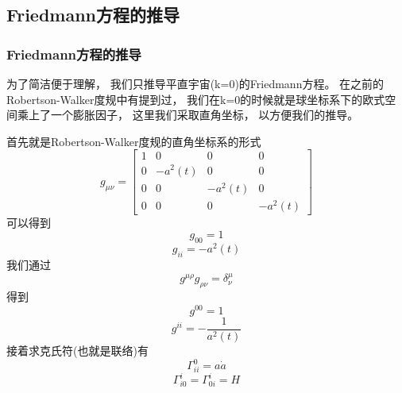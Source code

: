 \documentclass[8pt]{beamer}
\begin{document}
    \subsection{Friedmann方程的推导}
        \begin{frame}[fragile]
            \frametitle{Friedmann方程的推导}
                \hypertarget{附录3}{} 
                \qquad   
                为了简洁便于理解，
                我们只推导平直宇宙(k=0)的Friedmann方程。
                在之前的Robertson-Walker度规中有提到过，
                我们在k=0的时候就是球坐标系下的欧式空间乘上了一个膨胀因子，
                这里我们采取直角坐标，
                以方便我们的推导。

                \qquad
                首先就是Robertson-Walker度规的直角坐标系的形式
                $$g_{\mu\nu}=
                \begin{bmatrix}
                    1 & 0 & 0 & 0\\
                    0 & -a^2(t)& 0 & 0\\
                    0 & 0 & -a^2(t)& 0\\
                    0 & 0 & 0 & -a^2(t)
                \end{bmatrix}
                $$
                可以得到
                $$g_{00}=1$$
                $$g_{ii}=-a^2(t)$$
                我们通过$$g^{\mu\rho}g_{\rho\nu}=\delta^{\mu}_{\nu}$$得到
                $$g^{00}=1$$
                $$g^{ii}=-\frac{1}{a^2(t)}$$
                接着求克氏符(也就是联络)有
                $$\varGamma^0_{ii}=a\dot{a}$$
                $$\varGamma^i_{i0}=\varGamma^i_{0i}=H$$
        \end{frame}
\end{document}
